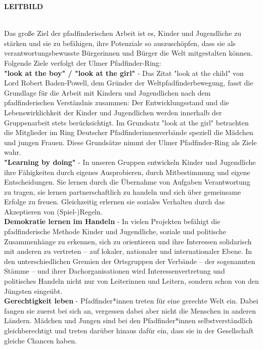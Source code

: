 \begin{Large}
    \textbf{LEITBILD}
\end{Large}
\\

Das große Ziel der pfadfinderischen Arbeit ist es, Kinder und Jugendliche zu stärken und sie zu 
befähigen, ihre Potenziale so auszuschöpfen, dass sie als verantwortungsbewusste Bürgerinnen und 
Bürger die Welt mitgestalten können. Folgende Ziele verfolgt der Ulmer Pfadfinder-Ring:
\\

\textbf{"look at the boy" / "look at the girl"} - Das Zitat "look at the child" von Lord Robert 
Baden-Powell, dem Gründer der Weltpfadfinderbewegung, fasst die Grundlage für die Arbeit mit Kindern 
und Jugendlichen nach dem pfadfinderischen Verständnis zusammen: Der Entwicklungsstand und die 
Lebenswirklichkeit der Kinder und Jugendlichen werden innerhalb der Gruppenarbeit stets 
berücksichtigt. Im Grundsatz "look at the girl" betrachten die Mitglieder im Ring Deutscher 
Pfadfinderinnenverbände speziell die Mädchen und jungen Frauen. Diese Grundsätze nimmt der Ulmer
Pfadfinder-Ring als Ziele wahr.
\\

\textbf{"Learning by doing"} - In unseren Gruppen entwickeln Kinder und Jugendliche ihre Fähigkeiten 
durch eigenes Ausprobieren, durch Mitbestimmung und eigene Entscheidungen. Sie lernen durch die 
Übernahme von Aufgaben Verantwortung zu tragen, sie lernen partnerschaftlich zu handeln und sich 
über gemeinsame Erfolge zu freuen. Gleichzeitig erlernen sie soziales Verhalten durch das 
Akzeptieren von (Spiel-)Regeln.
\\

\textbf{Demokratie lernen im Handeln} - In vielen Projekten befähigt die pfadfinderische Methode 
Kinder und Jugendliche, soziale und politische Zusammenhänge zu erkennen, sich zu orientieren und 
ihre Interessen solidarisch mit anderen zu vertreten – auf lokaler, nationaler und internationaler 
Ebene. In den unterschiedlichen Gremien der Ortsgruppen der Verbände – der sogenannten Stämme – und 
ihrer Dachorganisationen wird Interessenvertretung und politisches Handeln nicht nur von Leiterinnen 
und Leitern, sondern schon von den Jüngsten eingeübt.
\\

\textbf{Gerechtigkeit leben} - Pfadfinder*innen treten für eine gerechte Welt ein. Dabei fangen sie 
zuerst bei sich an, vergessen dabei aber nicht die Menschen in anderen Ländern. Mädchen und Jungen 
sind bei den Pfadfinder*innen selbstverständlich gleichberechtigt und treten darüber hinaus dafür 
ein, dass sie in der Gesellschaft gleiche Chancen haben.
\\

